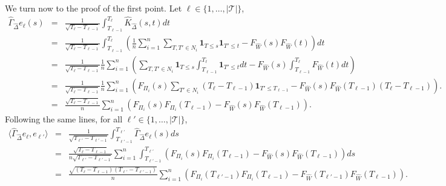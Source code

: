 \documentclass[aos]{imsart}
\theoremstyle{plain}
\theoremstyle{remark}
\newcommand{\1}{1}
\begin{document}
We turn now to the proof of the first point. Let $\ell\in \{1,\hdots,|\mathcal T|\}$, 
 \begin{eqnarray*}
 \widehat\Gamma_{\widehat\Delta} e_\ell(s)& = &\frac1{\sqrt{T_{\ell}-T_{\ell-1}}}\int_{T_{\ell-1}}^{T_\ell}\widehat K_{\widehat\Delta}(s,t)dt\\
 &=&\frac1{\sqrt{T_{\ell}-T_{\ell-1}}}\int_{T_{\ell-1}}^{T_\ell}\left(\frac1n\sum_{i=1}^n\sum_{T,T'\in N_i}\mathbf 1_{T\leq s}\mathbf 1_{T'\leq t}-F_{\widehat W}(s)F_{\widehat W}(t)\right)dt\\
 &=&\frac1{\sqrt{T_{\ell}-T_{\ell-1}}}\frac1n\sum_{i=1}^n\left(\sum_{T,T'\in N_i}\mathbf 1_{T\leq s}\int_{T_{\ell-1}}^{T_\ell}\mathbf 1_{T'\leq t}dt-F_{\widehat W}(s)\int_{T_{\ell-1}}^{T_\ell}F_{\widehat W}(t)dt\right)\\
 &=&\frac1{\sqrt{T_{\ell}-T_{\ell-1}}}\frac1n\sum_{i=1}^n\left(F_{\Pi_i}(s)\sum_{T'\in N_i}(T_\ell-T_{\ell-1})\mathbf 1_{T'\leq T_{\ell-1}}-F_{\widehat W}(s)     F_{\widehat W}(T_{\ell-1})(T_\ell-T_{\ell-1})\right).\\%
 &=&\frac{\sqrt{T_\ell-T_{\ell-1}}}n\sum_{i=1}^n\left(F_{\Pi_i}(s)F_{\Pi_i}(T_{\ell-1})-F_{\widehat W}(s)     F_{\widehat W}(T_{\ell-1})\right).
 \end{eqnarray*}
Following the same lines, for all $\ell'\in\{1,\hdots,|\mathcal T|\}$, 
\begin{eqnarray*}
\langle\widehat\Gamma_{\widehat\Delta} e_\ell,e_{\ell'}\rangle&=&\frac{1}{\sqrt{T_{{\ell'}}-T_{{\ell'}-1}}}\int_{T_{{\ell'}-1}}^{T_{{\ell'}}}\widehat\Gamma_{\widehat\Delta} e_\ell(s)ds\\
&=&\frac{\sqrt{T_\ell-T_{\ell-1}}}{n\sqrt{T_{{\ell'}}-T_{{\ell'}-1}}}\sum_{i=1}^n\int_{T_{{\ell'}-1}}^{T_{{\ell'}}}\left(F_{\Pi_i}(s)F_{\Pi_i}(T_{\ell-1})-F_{\widehat W}(s)     F_{\widehat W}(T_{\ell-1})\right)ds\\
&=&\frac{\sqrt{(T_\ell-T_{\ell-1})(T_{{\ell'}}-T_{{\ell'}-1})}}n\sum_{i=1}^n\left(F_{\Pi_i}(T_{\ell'-1})F_{\Pi_i}(T_{\ell-1})-F_{\widehat W}(T_{\ell'-1})     F_{\widehat W}(T_{\ell-1})\right).
\end{eqnarray*}
\end{document}
